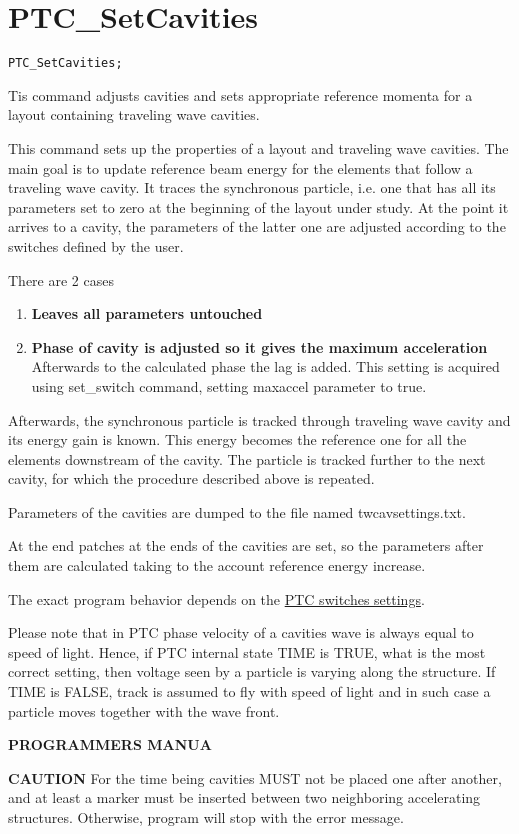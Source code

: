 
\section{PTC\_SetCavities}

\begin{verbatim}
PTC_SetCavities;
\end{verbatim}

Tis command adjusts cavities and sets appropriate reference momenta for
a layout containing traveling wave cavities.

This command sets up the properties of a layout and traveling wave
cavities.  The main goal is to update  reference beam energy for the
elements  that follow a traveling wave cavity.  It traces the
synchronous particle, i.e. one that has  all its parameters set to zero
at the beginning of the layout under study. At the point it arrives to a
cavity,  the parameters of the latter one are adjusted according to the
switches  defined by the user. 

There are 2 cases   
\begin{enumerate}
   \item \textbf{Leaves all parameters untouched}
   \item \textbf{Phase of cavity is adjusted so it gives the maximum
     acceleration} Afterwards to the calculated phase the lag
     is added. This setting is acquired using set\_switch
     command, setting maxaccel parameter to true.   
\end{enumerate} 

Afterwards,  the synchronous particle is tracked through traveling wave
cavity  and its energy gain is known.  This energy becomes the reference
one for all the elements downstream of the cavity.  The particle is
tracked further to the next cavity,  for which the procedure described
above is repeated.    

Parameters of the cavities are dumped to the file named
twcavsettings.txt.    

At the end patches at the ends of the cavities are set,  so the
parameters after them are  calculated taking to the account reference
energy increase.   

The exact program behavior depends on the  \href{PTC_SetSwitch.html}{
  PTC switches settings}.   

Please note that in PTC phase velocity of a cavities wave is always
equal to speed of light.  Hence, if PTC internal state TIME is TRUE,
what is the most correct setting,  then voltage seen by a particle is
varying along the structure. If TIME is FALSE,  track is assumed to fly
with speed of light and in such case a particle moves together with the
wave front.    


{\bf PROGRAMMERS MANUA}

{\bf CAUTION} For the time being cavities MUST not be placed one after
another, and at least a marker must be inserted between two neighboring
accelerating structures. Otherwise, program will stop with the error
message.    
